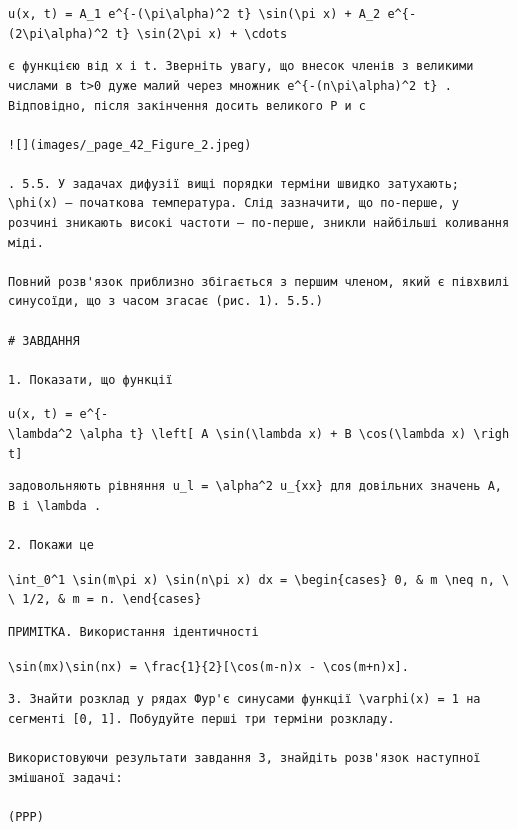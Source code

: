 \documentclass[
  ukrainian,
]{article}
\begin{document}
\texttt{u(x,\ t)\ =\ A\_1\ e\^{}\{-(\textbackslash{}pi\textbackslash{}alpha)\^{}2\ t\}\ \textbackslash{}sin(\textbackslash{}pi\ x)\ +\ A\_2\ e\^{}\{-(2\textbackslash{}pi\textbackslash{}alpha)\^{}2\ t\}\ \textbackslash{}sin(2\textbackslash{}pi\ x)\ +\ \textbackslash{}cdots}

\begin{verbatim}
є функцією від x і t. Зверніть увагу, що внесок членів з великими числами в t>0 дуже малий через множник e^{-(n\pi\alpha)^2 t} . Відповідно, після закінчення досить великого Р и с

![](images/_page_42_Figure_2.jpeg)

. 5.5. У задачах дифузії вищі порядки терміни швидко затухають; \phi(x) — початкова температура. Слід зазначити, що по-перше, у розчині зникають високі частоти — по-перше, зникли найбільші коливання міді.

Повний розв'язок приблизно збігається з першим членом, який є півхвилі синусоїди, що з часом згасає (рис. 1). 5.5.)

# ЗАВДАННЯ

1. Показати, що функції
\end{verbatim}

\texttt{u(x,\ t)\ =\ e\^{}\{-\textbackslash{}lambda\^{}2\ \textbackslash{}alpha\textquotesingle{}\ t\}\ \textbackslash{}left{[}\ A\ \textbackslash{}sin(\textbackslash{}lambda\ x)\ +\ B\ \textbackslash{}cos(\textbackslash{}lambda\ x)\ \textbackslash{}right{]}}

\begin{verbatim}
задовольняють рівняння u_l = \alpha^2 u_{xx} для довільних значень A, B і \lambda .

2. Покажи це
\end{verbatim}

\texttt{\textbackslash{}int\_0\^{}1\ \textbackslash{}sin(m\textbackslash{}pi\ x)\ \textbackslash{}sin(n\textbackslash{}pi\ x)\ dx\ =\ \textbackslash{}begin\{cases\}\ 0,\ \&\ m\ \textbackslash{}neq\ n,\ \textbackslash{}\textbackslash{}\ 1/2,\ \&\ m\ =\ n.\ \textbackslash{}end\{cases\}}

\begin{verbatim}
ПРИМІТКА. Використання ідентичності
\end{verbatim}

\texttt{\textbackslash{}sin(mx)\textbackslash{}sin(nx)\ =\ \textbackslash{}frac\{1\}\{2\}{[}\textbackslash{}cos(m-n)x\ -\ \textbackslash{}cos(m+n)x{]}.}

\begin{verbatim}
3. Знайти розклад у рядах Фур'є синусами функції \varphi(x) = 1 на сегменті [0, 1]. Побудуйте перші три терміни розкладу.

Використовуючи результати завдання 3, знайдіть розв'язок наступної змішаної задачі:

(PPP)
\end{verbatim}
\end{document}
